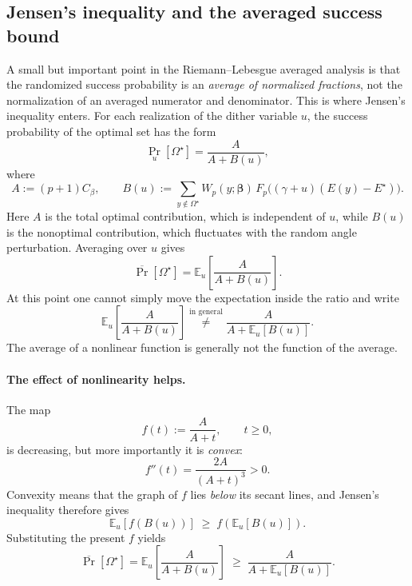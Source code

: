 \documentclass[a4paper,unpublished,onecolumn,11pt]{quantumarticle}
\theoremstyle{definition}
\theoremstyle{remark}
\begin{document}
\subsection{Jensen's inequality and the averaged success bound}
\label{subsec:jensen-pedagogical}

A small but important point in the Riemann--Lebesgue averaged analysis is that the randomized success probability is an \emph{average of normalized fractions}, not the normalization of an averaged numerator and denominator. This is where Jensen's inequality enters. For each realization of the dither variable $u$, the success probability of the
optimal set has the form
\begin{equation}
\label{eq:jensen-basic-success}
\Pr_u[\Omega^\star]
=
\frac{A}{A+B(u)},
\end{equation}
where
\begin{equation}
\label{eq:jensen-A-B}
A:=(p+1)C_\beta,
\qquad
B(u):=
\sum_{y\notin\Omega^\star}
W_p(y;\boldsymbol\beta)\,
F_p\!\bigl((\gamma+u)(E(y)-E^\star)\bigr).
\end{equation}
Here $A$ is the total optimal contribution, which is independent of $u$, while
$B(u)$ is the nonoptimal contribution, which fluctuates with the random angle
perturbation. Averaging over $u$ gives
\begin{equation}
\label{eq:jensen-avg-success}
\overline{\Pr}[\Omega^\star]
=
\mathbb E_u\!\left[\frac{A}{A+B(u)}\right].
\end{equation}
At this point one cannot simply move the expectation inside the ratio and write
\[
\mathbb E_u\!\left[\frac{A}{A+B(u)}\right]
\stackrel{\text{in general}}{\neq}
\frac{A}{A+\mathbb E_u[B(u)]}.
\]
The average of a nonlinear function is generally not the function of the average.

\paragraph{The effect of nonlinearity helps.}
The map
\begin{equation}
\label{eq:jensen-f-def}
f(t):=\frac{A}{A+t},
\qquad t\ge 0,
\end{equation}
is decreasing, but more importantly it is \emph{convex}:
\begin{equation}
\label{eq:jensen-second-deriv}
f''(t)=\frac{2A}{(A+t)^3}>0.
\end{equation}
Convexity means that the graph of $f$ lies \emph{below} its secant lines, and
Jensen's inequality therefore gives
\begin{equation}
\label{eq:jensen-main-step}
\mathbb E_u[f(B(u))]
\;\ge\;
f(\mathbb E_u[B(u)]).
\end{equation}
Substituting the present $f$ yields
\begin{equation}
\label{eq:jensen-applied}
\overline{\Pr}[\Omega^\star]
=
\mathbb E_u\!\left[\frac{A}{A+B(u)}\right]
\;\ge\;
\frac{A}{A+\mathbb E_u[B(u)]}.
\end{equation}
\end{document}
